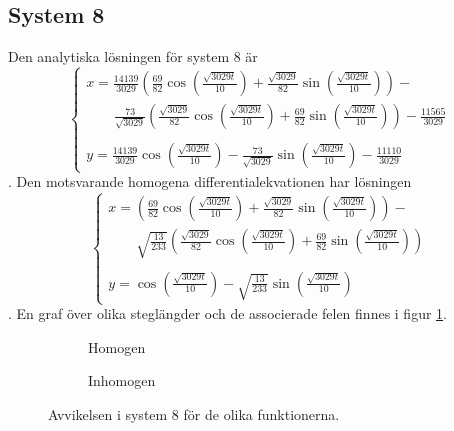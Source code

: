\subsection{System 8}
Den analytiska lösningen för system 8 är
\begin{equation*}
    \begin{cases}
        x=\frac{14139}{3029}(\frac{69}{82}\cos(\frac{\sqrt{3029t}}{10})+\frac{\sqrt{3029}}{82}\sin(\frac{\sqrt{3029t}}{10}))-\\
        \qquad \frac{73}{\sqrt{3029}}(\frac{\sqrt{3029}}{82}\cos(\frac{\sqrt{3029t}}{10})+\frac{69}{82}\sin(\frac{\sqrt{3029t}}{10}))-\frac{11565}{3029}\\
        \\[-7.5pt]
        y=\frac{14139}{3029}\cos(\frac{\sqrt{3029t}}{10})-\frac{73}{\sqrt{3029}}\sin(\frac{\sqrt{3029t}}{10})-\frac{11110}{3029}
    \end{cases}
\end{equation*}. Den motsvarande homogena differentialekvationen har lösningen 
\begin{equation*}
    \begin{cases}
        x=(\frac{69}{82}\cos(\frac{\sqrt{3029t}}{10})+\frac{\sqrt{3029}}{82}\sin(\frac{\sqrt{3029t}}{10}))-\\
        \qquad \sqrt{\frac{13}{233}}(\frac{\sqrt{3029}}{82}\cos(\frac{\sqrt{3029t}}{10})+\frac{69}{82}\sin(\frac{\sqrt{3029t}}{10}))\\
        \\[-7.5pt]
        y=\cos(\frac{\sqrt{3029t}}{10})-\sqrt{\frac{13}{233}}\sin(\frac{\sqrt{3029t}}{10})
    \end{cases}
\end{equation*}. En graf över olika steglängder och de associerade felen finnes i figur \ref{fig:diagram_sys_8_errors}.

\begin{figure}[h!]
    \centering

    \begin{subfigure}[h]{\textwidth}
        
        \caption{Homogen}
    \end{subfigure}
    \vspace{1em}\newline
    \begin{subfigure}[h]{\textwidth}
        
        \caption{Inhomogen}
    \end{subfigure}

    \caption{Avvikelsen i system 8 för de olika funktionerna.}
    \label{fig:diagram_sys_8_errors}
\end{figure}

